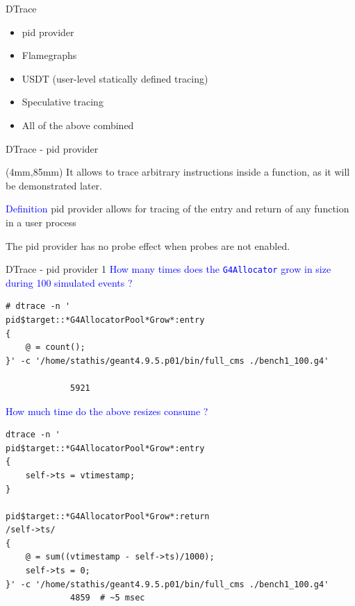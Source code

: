 \documentclass{beamer}
\newenvironment{reference}[2]{%
  \begin{textblock*}{\textwidth}(#1,#2) 
      \tiny\bgroup\color{red!50!black}}{\egroup\end{textblock*}}
\begin{document}
\begin{frame}{DTrace}

\begin{itemize}
\item pid provider
\item Flamegraphs
\item USDT (user-level statically defined tracing)
\item Speculative tracing
\item All of the above combined
\end{itemize}
\end{frame}


\begin{frame}{DTrace - pid provider}
\begin{reference}{4mm}{85mm}
It allows to trace arbitrary instructions inside a function, as it will be
demonstrated later.
\end{reference} 

\textcolor{blue}{Definition} pid provider allows for tracing of the entry and
return of any function in a user process

\vspace{5mm}

The pid provider has no probe effect when probes are not enabled.
\end{frame}



\begin{frame}[fragile]{DTrace - pid provider 1}
\textcolor{blue}{How many times does the {\tt G4Allocator} grow in size during 100 simulated events ?}

\lstset{frame=single, columns=flexible}
\lstset{basicstyle=\tiny\ttfamily}
\begin{lstlisting}
# dtrace -n '
pid$target::*G4AllocatorPool*Grow*:entry
{
    @ = count();
}' -c '/home/stathis/geant4.9.5.p01/bin/full_cms ./bench1_100.g4'

             5921
\end{lstlisting}

\textcolor{blue}{How much time do the above resizes consume ?}

\lstset{frame=single, columns=flexible}
\lstset{basicstyle=\tiny\ttfamily}
\begin{lstlisting}
dtrace -n '
pid$target::*G4AllocatorPool*Grow*:entry
{
    self->ts = vtimestamp;
}

pid$target::*G4AllocatorPool*Grow*:return
/self->ts/
{
    @ = sum((vtimestamp - self->ts)/1000);
    self->ts = 0;
}' -c '/home/stathis/geant4.9.5.p01/bin/full_cms ./bench1_100.g4'
             4859  # ~5 msec
\end{lstlisting}
\end{frame}
\end{document}
